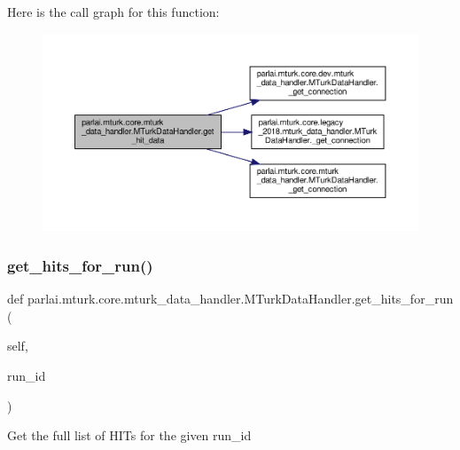 Here is the call graph for this function\+:
\nopagebreak
\begin{figure}[H]
\begin{center}
\leavevmode
\includegraphics[width=350pt]{classparlai_1_1mturk_1_1core_1_1mturk__data__handler_1_1MTurkDataHandler_a753c4a107539e6085fb2fd8402ed35e2_cgraph}
\end{center}
\end{figure}
\mbox{\label{classparlai_1_1mturk_1_1core_1_1mturk__data__handler_1_1MTurkDataHandler_a9f4e9c9bec7d5d47efd4492dfb751b5c}} 
\subsubsection{\texorpdfstring{get\+\_\+hits\+\_\+for\+\_\+run()}{get\_hits\_for\_run()}}
{\footnotesize\ttfamily def parlai.\+mturk.\+core.\+mturk\+\_\+data\+\_\+handler.\+M\+Turk\+Data\+Handler.\+get\+\_\+hits\+\_\+for\+\_\+run (\begin{DoxyParamCaption}\item[{}]{self,  }\item[{}]{run\+\_\+id }\end{DoxyParamCaption})}

\begin{DoxyVerb}Get the full list of HITs for the given run_id\end{DoxyVerb}
 

